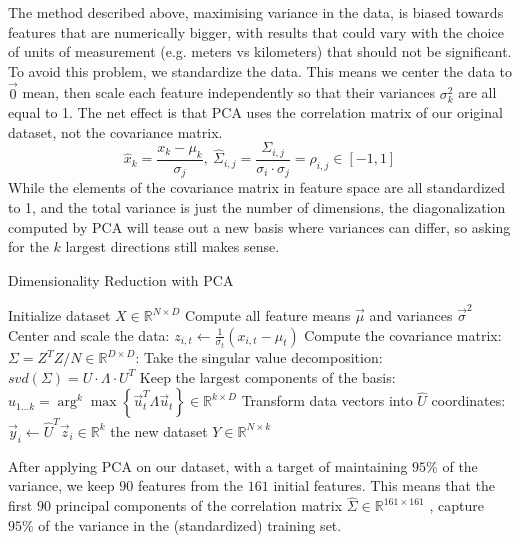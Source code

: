 \documentclass[twocolumn]{article}
\begin{document}
The method described above, maximising variance in the data, is biased towards features that are numerically bigger, with results that could vary with the choice of units of measurement (e.g. meters vs kilometers) that should not be significant. To avoid this problem, we standardize the data. This means we center the data to $\Vec{0}$ mean, then scale each feature independently so that their variances $\sigma^2_k$ are all equal to 1. The net effect is that PCA uses the correlation matrix of our original dataset, not the covariance matrix.
$$\hat{x}_k = \frac{x_k - \mu_k}{\sigma_j}, \ \hat{\Sigma}_{i,j} = \frac{\Sigma_{i,j}}{\sigma_i \cdot \sigma_j} = \rho_{i,j} \in [-1, 1]$$
While the elements of the covariance matrix in feature space are all standardized to 1, and the total variance is just the number of dimensions, the diagonalization computed by PCA will tease out a new basis where variances can differ, so asking for the $k$ largest directions still makes sense.

\begin{algorithm}
\caption{Dimensionality Reduction with PCA}
\label{algo2}
\begin{algorithmic}[1]
\State Initialize dataset $X \in \mathbb{R}^{N \times D}$
\State Compute all feature means $\Vec{\mu}$ and variances $\Vec{\sigma}^2$
\Statex Center and scale the data:
    \State $z_{i,t} \gets \frac{1}{\sigma_t}(x_{i,t} - \mu_t)$
\EndFor
\Statex Compute the covariance matrix:
\State $\Sigma = Z^TZ/N \in \mathbb{R}^{D \times D}$:
\Statex Take the singular value decomposition:
\State $svd(\Sigma) = U \cdot \Lambda \cdot U^T$
\Statex Keep the largest components of the basis:
\State $\hat{u}_{1 \dots k} = \arg^k \max \left\{ \Vec{u}_t^T \Lambda \Vec{u}_t \right\} \in \mathbb{R}^{k \times D}$
\Statex Transform data vectors into $\hat{U}$ coordinates:
    \State $\Vec{y}_i \gets \hat{U}^T \Vec{z}_i \in \mathbb{R}^k$
\EndFor
\State \Return the new dataset $Y \in \mathbb{R}^{N \times k}$
\end{algorithmic}
\end{algorithm}

After applying PCA on our dataset, with a target of maintaining $95\%$ of the variance, we keep $90$ features from the $161$ initial features. This means that the first $90$ principal components of the correlation matrix $\hat{\Sigma} \in \mathbb{R}^{161 \times 161}$ , capture $95\%$ of the variance in the (standardized) training set.
\end{document}
